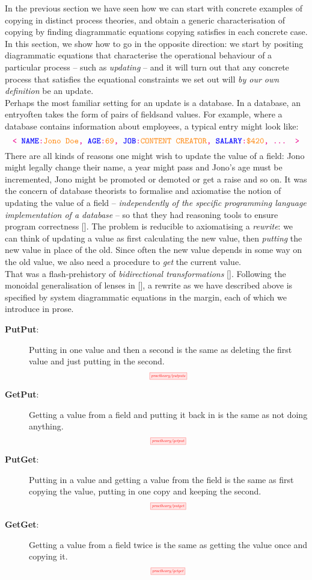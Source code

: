In the previous section we have seen how we can start with concrete examples of copying in distinct process theories, and obtain a generic characterisation of copying by finding diagrammatic equations copying satisfies in each concrete case. In this section, we show how to go in the opposite direction: we start by positing diagrammatic equations that characterise the operational behaviour of a particular process -- such as \emph{updating} -- and it will turn out that any concrete process that satisfies the equational constraints we set out will \emph{by our own definition} be an update.\\

Perhaps the most familiar setting for an update is a database. In a database, an \bM entry\e often takes the form of pairs of \bB fields\e and \bO values\e. For example, where a database contains information about employees, a typical entry might look like:
\[\texttt{\bM < \bB\textbf{NAME}\e:\bO Jono Doe\e, \bB\textbf{AGE}\e:\bO 69\e, \bB\textbf{JOB}\e:\bO CONTENT CREATOR\e, \bB\textbf{SALARY}\e:\bO\$420\e, ... >\e}\]
There are all kinds of reasons one might wish to update the value of a field: Jono might legally change their name, a year might pass and Jono's age must be incremented, Jono might be promoted or demoted or get a raise and so on. It was the concern of database theorists to formalise and axiomatise the notion of updating the value of a field -- \emph{independently of the specific programming language implementation of a database} -- so that they had reasoning tools to ensure program correctness []. The problem is reducible to axiomatising a \emph{rewrite}: we can think of updating a value as first calculating the new value, then \emph{putting} the new value in place of the old. Since often the new value depends in some way on the old value, we also need a procedure to \emph{get} the current value.\\

That was a flash-prehistory of \emph{bidirectional transformations} []. Following the monoidal generalisation of lenses in [], a rewrite as we have described above is specified by system diagrammatic equations in the margin, each of which we introduce in prose.

\begin{description}
\item[\textbf{PutPut}:] Putting in one value and then a second is the same as deleting the first value and just putting in the second.
\[\scalebox{0.5}{\tikzfig{proctheory/putputs}}\]
\item[\textbf{GetPut}:] Getting a value from a field and putting it back in is the same as not doing anything.
\[\scalebox{0.5}{\tikzfig{proctheory/getput}}\]
\item[\textbf{PutGet}:] Putting in a value and getting a value from the field is the same as first copying the value, putting in one copy and keeping the second.
\[\scalebox{0.5}{\tikzfig{proctheory/putget}}\]
\item[\textbf{GetGet}:] Getting a value from a field twice is the same as getting the value once and copying it.
\[\scalebox{0.5}{\tikzfig{proctheory/getget}}\]
\end{description}


